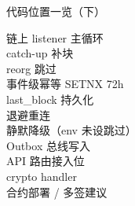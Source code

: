 \documentclass[aspectratio=169,11pt]{beamer}
\begin{document}
\begin{frame}[shrink]{代码位置一览（下）}
\small
\begin{description}
  \item[链上 listener 主循环]
  \item[catch-up 补块]
  \item[reorg 跳过]
  \item[事件级幂等 SETNX 72h]
  \item[last\_block 持久化]
  \item[退避重连]
  \item[静默降级（env 未设跳过）]
  \item[Outbox 总线写入]
  \item[API 路由接入位]
  \item[crypto handler]
  \item[合约部署 / 多签建议]
\end{description}
\end{frame}
\end{document}

